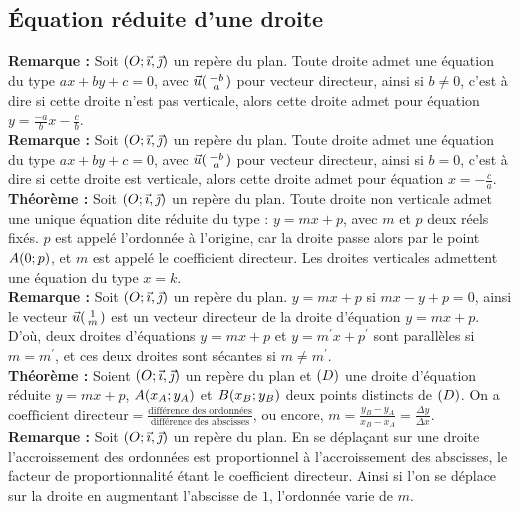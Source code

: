 \documentclass[a4paper,titlepage]{article}
\let\oldleft\left
\renewcommand{\left}{\mathopen{}\mathclose\bgroup\oldleft}
\let\oldright\right
\renewcommand{\right}{\aftergroup\egroup\oldright}
\begin{document}
    \subsection{Équation réduite d'une droite}
        \textbf{Remarque :} Soit $\left(O;\vec{\imath},\vec{\jmath}\right)$ un repère du plan. Toute droite admet une équation du type $ax+by+c=0$, avec $\vec{u}\left(\begin{smallmatrix}-b\\a\end{smallmatrix}\right)$ pour vecteur directeur, ainsi si $b\neq0$, c’est à dire si cette droite n’est pas verticale, alors cette droite admet pour équation $y=\frac{-a}{b}x-\frac{c}{b}$.
        \\
        \textbf{Remarque :} Soit $\left(O;\vec{\imath},\vec{\jmath}\right)$ un repère du plan. Toute droite admet une équation du type $ax+by+c=0$, avec $\vec{u}\left(\begin{smallmatrix}-b\\a\end{smallmatrix}\right)$ pour vecteur directeur, ainsi si $b=0$, c’est à dire si cette droite est verticale, alors cette droite admet pour équation $x=-\frac{c}{a}$.
        \\
        \textbf{Théorème :} Soit $\left(O;\vec{\imath},\vec{\jmath}\right)$ un repère du plan. Toute droite non verticale admet une unique équation dite réduite du type : $y=mx+p$, avec $m$ et $p$ deux réels fixés. $p$ est appelé l’ordonnée à l’origine, car la droite passe alors par le point $A\left(0;p\right)$, et $m$ est appelé le coefficient directeur. Les droites verticales admettent une équation du type $x=k$.
        \\
        \textbf{Remarque :} Soit $\left(O;\vec{\imath},\vec{\jmath}\right)$ un repère du plan. $y=mx+p$ si $mx-y+p=0$, ainsi le vecteur $\vec{u}\left(\begin{smallmatrix}1\\m\end{smallmatrix}\right)$ est un vecteur directeur de la droite d’équation $y=mx+p$. D’où, deux droites d’équations $y=mx+p$ et $y=m^{\prime}x+p^{\prime}$ sont parallèles si $m=m^{\prime}$, et ces deux droites sont sécantes si $m\neq m^{\prime}$.
        \\
        \textbf{Théorème :} Soient $\left(O;\vec{\imath},\vec{\jmath}\right)$ un repère du plan et $\left(D\right)$ une droite d'équation réduite $y=mx+p$, $A\left(x_{A};y_{A}\right)$ et $B\left(x_{B};y_{B}\right)$ deux points distincts de $\left(D\right)$. On a $\text{coefficient directeur}=\frac{\text{différence des ordonnées}}{\text{différence des abscisses}}$, ou encore, $m=\frac{y_{B}-y_{A}}{x_{B}-x_{A}}=\frac{\varDelta y}{\varDelta x}$.
        \\
        \textbf{Remarque :} Soit $\left(O;\vec{\imath},\vec{\jmath}\right)$ un repère du plan. En se déplaçant sur une droite l’accroissement des ordonnées est proportionnel à l’accroissement des abscisses, le facteur de proportionnalité étant le coefficient directeur. Ainsi si l’on se déplace sur la droite en augmentant l’abscisse de $1$, l’ordonnée varie de $m$.
\end{document}
